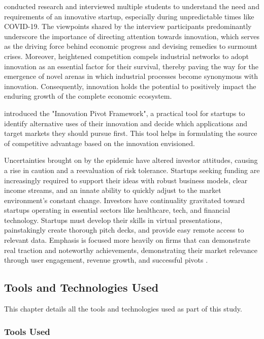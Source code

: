 \documentclass[12pt]{article}
\begin{document}
\citep{buarbulescu2021innovation} conducted research and interviewed multiple students to understand the need and requirements of an innovative startup, especially during unpredictable times like COVID-19. The viewpoints shared by the interview participants predominantly underscore the importance of directing attention towards innovation, which serves as the driving force behind economic progress and devising remedies to surmount crises. Moreover, heightened competition compels industrial networks to adopt innovation as an essential factor for their survival, thereby paving the way for the emergence of novel arenas in which industrial processes become synonymous with innovation. Consequently, innovation holds the potential to positively impact the enduring growth of the complete economic ecosystem.

\citep{garcia2016innovation} introduced the "Innovation Pivot Framework", a practical tool for startups to identify alternative uses of their innovation and decide which applications and target markets they should pursue first. This tool helps in formulating the source of competitive advantage based on the innovation envisioned.

Uncertainties brought on by the epidemic have altered investor attitudes, causing a rise in caution and a reevaluation of risk tolerance. Startups seeking funding are increasingly required to support their ideas with robust business models, clear income streams, and an innate ability to quickly adjust to the market environment's constant change. Investors have continuality gravitated toward startups operating in essential sectors like healthcare, tech, and financial technology. Startups must develop their skills in virtual presentations, painstakingly create thorough pitch decks, and provide easy remote access to relevant data. Emphasis is focused more heavily on firms that can demonstrate real traction and noteworthy achievements, demonstrating their market relevance through user engagement, revenue growth, and successful pivots \citep{kumar2023resilience}.

\subsection{Tools and Technologies Used }

This chapter details all the tools and technologies used as part of this study.

\subsubsection{Tools Used}
\end{document}
